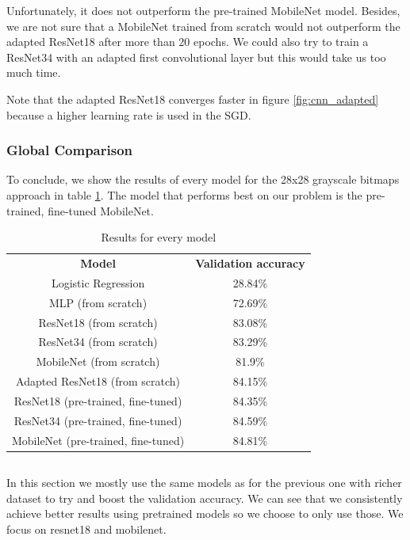\documentclass[10pt,twocolumn,letterpaper]{article}
\begin{document}
Unfortunately, it does not outperform the pre-trained MobileNet model. Besides, we are not sure that a MobileNet trained from scratch would not outperform the adapted ResNet18 after more than 20 epochs. We could also try to train a ResNet34 with an adapted first convolutional layer but this would take us too much time.

Note that the adapted ResNet18 converges faster in figure \ref{fig:cnn_adapted} because a higher learning rate is used in the SGD.

\subsubsection{Global Comparison}

To conclude, we show the results of every model for the 28x28 grayscale bitmaps approach in table \ref{tab:cnn_every_results}. The model that performs best on our problem is the pre-trained, fine-tuned MobileNet.

\begin{table}[h]
    \centering
    \begin{tabular}{c|c}
    \textbf{Model}                      & \textbf{Validation accuracy} \\
    Logistic Regression                 & 28.84\%             \\
    MLP (from scratch)                  & 72.69\%             \\
    ResNet18 (from scratch)             & 83.08\%             \\
    ResNet34 (from scratch)             & 83.29\%             \\
    MobileNet (from scratch)            & 81.9\%              \\
    Adapted ResNet18 (from scratch)     & 84.15\%             \\
    ResNet18 (pre-trained, fine-tuned)  & 84.35\%             \\
    ResNet34 (pre-trained, fine-tuned)  & 84.59\%             \\
    MobileNet (pre-trained, fine-tuned) & 84.81\%            
    \end{tabular}
    \caption{Results for every model}
    \label{tab:cnn_every_results}
\end{table}

\subsection{\imgenTitle{}}
In this section we mostly use the same models as for the previous one with richer dataset to try and boost the validation accuracy.
We can see that we consistently achieve better results using pretrained models so we choose to only use those. We focus on resnet18 and mobilenet.
\end{document}
